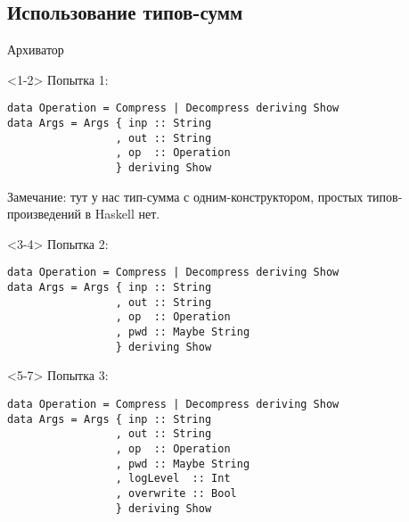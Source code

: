 \subsection{Использование типов-сумм}
\begin{frame}
\end{frame}

\begin{frame}[t,fragile]{Архиватор}

\begin{onlyenv}<1-2>
Попытка 1:
\begin{verbatim}
data Operation = Compress | Decompress deriving Show
data Args = Args { inp :: String
                 , out :: String
                 , op  :: Operation
                 } deriving Show
\end{verbatim}
Замечание: тут у нас тип-сумма с одним-конструктором, простых типов-произведений в Haskell нет.
\end{onlyenv}

\begin{onlyenv}<3-4>
Попытка 2:
\begin{verbatim}
data Operation = Compress | Decompress deriving Show
data Args = Args { inp :: String
                 , out :: String
                 , op  :: Operation
                 , pwd :: Maybe String
                 } deriving Show
\end{verbatim}
\end{onlyenv}

\begin{onlyenv}<5-7>
Попытка 3:
\begin{verbatim}
data Operation = Compress | Decompress deriving Show
data Args = Args { inp :: String
                 , out :: String
                 , op  :: Operation
                 , pwd :: Maybe String
                 , logLevel  :: Int
                 , overwrite :: Bool
                 } deriving Show
\end{verbatim}
\end{onlyenv}


\end{frame}
